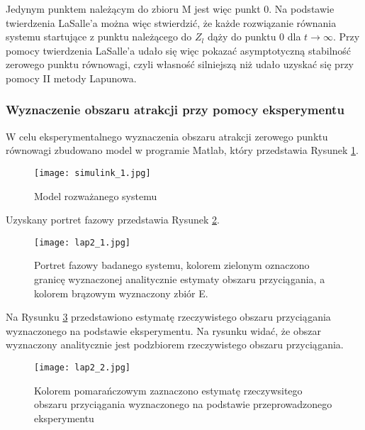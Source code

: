 \documentclass[a4paper,11pt]{article}
\begin{document}
Jedynym punktem należącym do zbioru M jest więc punkt 0. Na podstawie twierdzenia LaSalle'a można więc stwierdzić, że każde rozwiązanie równania systemu startujące z punktu należącego do \( Z_{l} \) dąży do punktu 0 dla \( t \rightarrow \infty \). Przy pomocy twierdzenia LaSalle'a udało się więc pokazać asymptotyczną stabilność zerowego punktu równowagi, czyli własność silniejszą niż udało uzyskać się przy pomocy II metody Lapunowa. 
\subsubsection{Wyznaczenie obszaru atrakcji przy pomocy eksperymentu}
W celu eksperymentalnego wyznaczenia obszaru atrakcji zerowego punktu równowagi zbudowano model w programie Matlab, który przedstawia Rysunek \ref{fig:simulink_1}.
\begin{figure}[H]
\centerline{\texttt{[image: simulink\_1.jpg]}}
\centering
\caption{Model rozważanego systemu}
\label{fig:simulink_1}
\end{figure}
Uzyskany portret fazowy przedstawia Rysunek \ref{fig:lap2_1}. 
\begin{figure}[H]
\centerline{\texttt{[image: lap2\_1.jpg]}}
\caption{Portret fazowy badanego systemu, kolorem zielonym oznaczono granicę wyznaczonej analitycznie estymaty obszaru przyciągania, a kolorem brązowym wyznaczony zbiór E.}
\label{fig:lap2_1}
\end{figure}
\newpage
Na Rysunku \ref{fig:lap2_2} przedstawiono estymatę rzeczywistego obszaru przyciągania wyznaczonego na podstawie eksperymentu. Na rysunku widać, że obszar wyznaczony analitycznie jest podzbiorem rzeczywistego obszaru przyciągania.
\begin{figure}[H]
\centerline{\texttt{[image: lap2\_2.jpg]}}
\caption{Kolorem pomarańczowym zaznaczono estymatę rzeczywsitego obszaru przyciągania wyznaczonego na podstawie przeprowadzonego eksperymentu}
\label{fig:lap2_2}
\end{figure}
\end{document}
